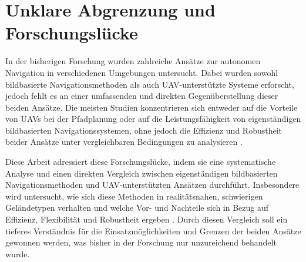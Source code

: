 \section{Unklare Abgrenzung und Forschungslücke}
In der bisherigen Forschung wurden zahlreiche Ansätze zur autonomen Navigation in verschiedenen Umgebungen untersucht. 
Dabei wurden sowohl bildbasierte Navigationsmethoden als auch UAV-unterstützte Systeme erforscht, jedoch fehlt es an einer umfassenden und direkten Gegenüberstellung dieser beiden Ansätze. 
Die meisten Studien konzentrieren sich entweder auf die Vorteile von UAVs bei der Pfadplanung oder auf die Leistungsfähigkeit von eigenständigen bildbasierten Navigationssystemen, ohne jedoch die Effizienz und Robustheit beider Ansätze unter vergleichbaren Bedingungen zu analysieren \cite{multi:objective:ugv:navigation,ugv:coverage:energy:efficient}.

Diese Arbeit adressiert diese Forschungslücke, indem sie eine systematische Analyse und einen direkten Vergleich zwischen eigenständigen bildbasierten Navigationsmethoden und UAV-unterstützten Ansätzen durchführt. Insbesondere wird untersucht, wie sich diese Methoden in realitätsnahen, schwierigen Geländetypen verhalten und welche Vor- und Nachteile sich in Bezug auf Effizienz, Flexibilität und Robustheit ergeben \cite{mapless:ugv:navigation,airsim2017fsr}. 
Durch diesen Vergleich soll ein tieferes Verständnis für die Einsatzmöglichkeiten und Grenzen der beiden Ansätze gewonnen werden, was bisher in der Forschung nur unzureichend behandelt wurde.
